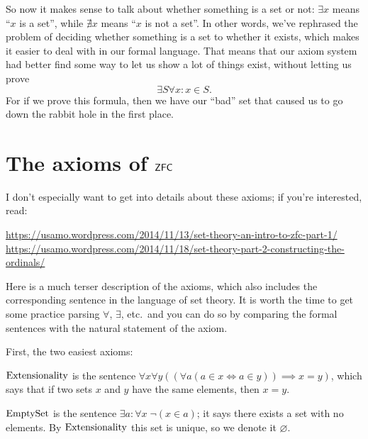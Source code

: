 So now it makes sense to talk about whether something is a set or not:
$\exists x$ means ``$x$ is a set'', while $\nexists x$ means ``$x$ is not a set''.
In other words, we've rephrased the problem of deciding whether something
is a set to whether it exists,
which makes it easier to deal with in our formal language.
That means that our axiom system had better find some way to let us
show a lot of things exist, without letting us prove
\[ \exists S \forall x : x \in S. \]
For if we prove this formula,
then we have our ``bad'' set that caused us to go down the
rabbit hole in the first place.

\section{The axioms of $\mathsf{ZFC}$}
I don't especially want to get into details about these axioms;
if you're interested, read:
\begin{itemize}
	\ii \footnotesize \url{https://usamo.wordpress.com/2014/11/13/set-theory-an-intro-to-zfc-part-1/}
	\ii \footnotesize \url{https://usamo.wordpress.com/2014/11/18/set-theory-part-2-constructing-the-ordinals/}
\end{itemize}
Here is a much terser description of the axioms,
which also includes the corresponding sentence in the language of set theory.
It is worth the time to get some practice parsing $\forall$, $\exists$, etc.\
and you can do so by comparing the formal sentences with the natural statement of the axiom.

First, the two easiest axioms:
\begin{itemize}
	\ii $\mathrm{Extensionality}$ is the sentence
	$\forall x \forall y
	\left( \left( \forall a  \left( a \in x \iff a \in y \right) \right)
	\implies x = y \right)$,
	which says that if two sets $x$ and $y$ have the same elements,
	then $x = y$.

	\ii $\mathrm{EmptySet}$ is the sentence $\exists a : \forall x \; \neg (x \in a)$;
	it says there exists a set with no elements.
	By $\mathrm{Extensionality}$ this set is unique, so we denote it $\varnothing$.
\end{itemize}

